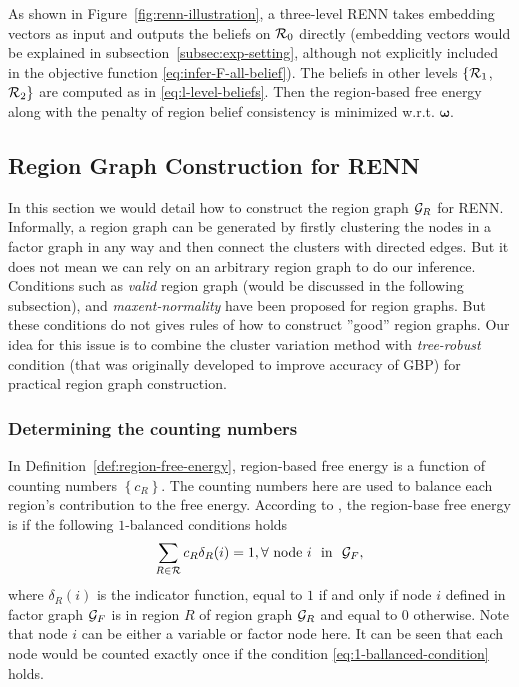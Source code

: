 As shown in Figure~\ref{fig:renn-illustration}, a three-level RENN takes embedding vectors as input and outputs the beliefs on $\mathcal{R}_0$ directly (embedding vectors would be explained in subsection~\ref{subsec:exp-setting}, although not explicitly included in the objective function \eqref{eq:infer-F-all-belief}). The beliefs in other levels $\{\mathcal{R}_1$, $\mathcal{R}_2\}$ are computed as in \eqref{eq:l-level-beliefs}. Then the region-based free energy along with the penalty of region belief consistency is minimized w.r.t. $\bm{\omega}$.

\subsection{Region Graph Construction for RENN}
In this section we would detail how to construct the region graph $\mathcal{G}_R$ for RENN.
Informally, a region graph can be generated by firstly clustering the nodes in a factor graph in any way and then connect the clusters with directed edges. But it does not mean we can rely on an arbitrary region graph to do our inference. Conditions such as \textit{valid} region graph (would be discussed in the following subsection), and \textit{maxent-normality} \cite{yedida2005constucting,welling2005structured} have been proposed for region graphs. But these conditions do not gives rules of how to construct ''good'' region graphs.
Our idea for this issue is to combine the cluster variation method \cite{PhysRev.81.988,morita1991cluster} with \textit{tree-robust} condition \cite{gelfand2012generalized} (that was originally developed to improve accuracy of GBP) for practical region graph construction.


\subsubsection{Determining the counting numbers}
\label{subsec:count-number}
In Definition~\ref{def:region-free-energy}, region-based free energy is a function of counting numbers $\left\{ c_R \right\}$. The counting numbers here are used to balance each region's contribution to the free energy. According to \cite{yedida2005constucting}, the region-base free energy is  if the following $1$-balanced conditions holds
\begin{equation}\label{eq:1-ballanced-condition}
  \sum_{R\in\mathcal{R}} c_R \delta_{R}(i)  = 1, \forall~ \mathrm{node}~ i~~ \mathrm{in} ~~\mathcal{G}_F,
\end{equation}
where $\delta_{R}(i)$ is the indicator function, equal to $1$ if and only if node $i$ defined in factor graph $\mathcal{G}_F$ is in region $R$ of region graph $\mathcal{G}_R$ and equal to $0$ otherwise. Note that node $i$ can be either a variable or factor node here. It can be seen that each node would be counted exactly once if the condition \eqref{eq:1-ballanced-condition} holds.

